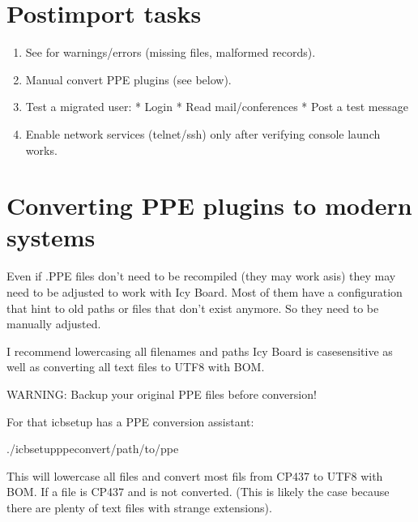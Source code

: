 \documentclass[letterpaper,10pt,english]{sphinxmanual}
\begin{document}
\section{Post\sphinxhyphen{}import tasks}
\label{\detokenize{index:post-import-tasks}}\begin{enumerate}
%
\item {} 
\sphinxAtStartPar
See  for warnings/errors (missing files, malformed records).

\item {} 
\sphinxAtStartPar
Manual convert PPE plugins (see below).

\item {} 
\sphinxAtStartPar
Test a migrated user:
* Login
* Read mail/conferences
* Post a test message

\item {} 
\sphinxAtStartPar
Enable network services (telnet/ssh) only after verifying console launch works.

\end{enumerate}


\section{Converting PPE plugins to modern systems}
\label{\detokenize{index:converting-ppe-plugins-to-modern-systems}}
\sphinxAtStartPar
Even if .PPE files don’t need to be recompiled (they may work as\sphinxhyphen{}is) they may need to be adjusted to work with Icy Board.
Most of them have a configuration that hint to old paths or files that don’t exist anymore. So they need to be manually adjusted.

\sphinxAtStartPar
I recommend lowercasing all filenames and paths \sphinxhyphen{} Icy Board is case\sphinxhyphen{}sensitive as well as converting all text files to UTF\sphinxhyphen{}8 with BOM.

\sphinxAtStartPar
WARNING: Backup your original PPE files before conversion!

\sphinxAtStartPar
For that icbsetup has a PPE conversion assistant:

\begin{sphinxVerbatim}[commandchars=\\\{\}]
./icbsetupppe\PYGZhy{}convert/path/to/ppe
\end{sphinxVerbatim}

\sphinxAtStartPar
This will lowercase all files and convert most fils from CP437 to UTF\sphinxhyphen{}8 with BOM. If a file is CP437 and is not converted.
(This is likely the case because there are plenty of text files with strange extensions).
\end{document}
